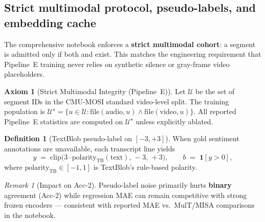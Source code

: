 \documentclass[12pt,a4paper]{article}
\theoremstyle{definition}
\newtheorem{definition}{Definition}[section]
\newtheorem{axiom}{Axiom}[section]
\theoremstyle{plain}
\theoremstyle{remark}
\newtheorem{remark}{Remark}[section]
\begin{document}
\subsection{Strict multimodal protocol, pseudo-labels, and embedding cache}
\label{sec:pipelineE_strict}

The comprehensive notebook enforces a \textbf{strict multimodal cohort}: a segment is admitted only if both  and  exist. This matches the engineering requirement that Pipeline~E training never relies on synthetic silence or gray-frame video placeholders.

\begin{axiom}[Strict Multimodal Integrity (Pipeline~E)]
\label{ax:strict_mosi}
Let $\mathcal{U}$ be the set of segment IDs in the CMU-MOSI standard video-level split. The training population is $\mathcal{U}^\star = \{u \in \mathcal{U} : \text{file}(\text{audio},u) \wedge \text{file}(\text{video},u)\}$. All reported Pipeline~E statistics are computed on $\mathcal{U}^\star$ unless explicitly ablated.
\end{axiom}

\begin{definition}[TextBlob pseudo-label on {$[-3,+3]$}]
When gold sentiment annotations are unavailable, each transcript line yields
\[
  y \;=\; \mathrm{clip}\bigl(3 \cdot \mathrm{polarity}_{\text{TB}}(\text{text}),\,-3,\,+3\bigr),\qquad
  b \;=\; \mathbf{1}[y > 0],
\]
where $\mathrm{polarity}_{\text{TB}} \in [-1,1]$ is TextBlob's rule-based polarity.
\end{definition}

\begin{remark}[Impact on Acc-2]
Pseudo-label noise primarily hurts \textbf{binary} agreement (Acc-2) while regression MAE can remain competitive with strong frozen encoders --- consistent with reported MAE vs.\ MulT/MISA comparisons in the notebook.
\end{remark}
\end{document}

